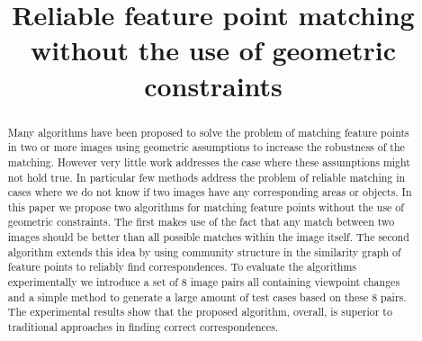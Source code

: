 \documentclass[conference]{IEEEtran}
\begin{document}
\title{Reliable feature point matching without the use of geometric 
constraints}

\maketitle
%
\begin{abstract}
Many algorithms have been proposed to solve the problem of matching 
feature points in two or more images using geometric assumptions to 
increase the robustness of the matching. However very little work 
addresses the case where these assumptions might not hold true. In 
particular few methods address the problem of reliable matching in cases 
where we do not know if two images have any corresponding areas or 
objects. In this paper we propose two algorithms for matching feature 
points without the use of geometric constraints. The first makes use of 
the fact that any match between two images should be better than all 
possible matches within the image itself. The second algorithm extends 
this idea by using community structure in the similarity graph of 
feature points to reliably find correspondences. To evaluate the 
algorithms experimentally we introduce a set of 8 image pairs all 
containing viewpoint changes and a simple method to generate a large 
amount of test cases based on these 8 pairs. The experimental results 
show that the proposed algorithm, overall, is superior to traditional 
approaches in finding correct correspondences.
\end{abstract}
%
\end{document}
